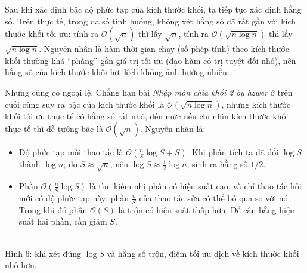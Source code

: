 \documentclass[11pt]{article}
\newcommand{\Oh}{\mathcal{O}}
\begin{document}
Sau khi xác định bậc độ phức tạp của kích thước khối, ta tiếp tục xác định
hằng số. Trên thực tế, trong đa số tình huống, không xét hằng số đã rất gần
với kích thước khối tối ưu: tính ra \(\Oh(\sqrt n)\) thì lấy \(\sqrt n\),
tính ra \(\Oh(\sqrt{n\log n})\) thì lấy \(\sqrt{n\log n}\). Nguyên nhân là
hàm thời gian chạy (số phép tính) theo kích thước khối thường khá ``phẳng''
gần giá trị tối ưu (đạo hàm có trị tuyệt đối nhỏ), nên hằng số của kích thước
khối hơi lệch không ảnh hưởng nhiều.

Nhưng cũng có ngoại lệ. Chẳng hạn bài \emph{Nhập môn chia khối 2 by hzwer} ở
trên cuối cùng suy ra bậc của kích thước khối là \(\Oh(\sqrt{n\log n})\),
nhưng kích thước khối tối ưu thực tế có hằng số rất nhỏ, đến mức nếu chỉ nhìn
kích thước khối thực tế thì dễ tưởng bậc là \(\Oh(\sqrt n)\). Nguyên nhân là:
\begin{itemize}
  \item Độ phức tạp mỗi thao tác là
  \(\Oh\left(\frac nS\log S+S\right)\). Khi phân tích ta đã đổi
  \(\log S\) thành \(\log n\); do \(S\approx \sqrt n\), nên
  \(\log S\approx \frac12\log n\), sinh ra hằng số \(1/2\).
  \item Phần \(\Oh\left(\frac nS\log S\right)\) là tìm kiếm nhị phân có hiệu
  suất cao, và chỉ thao tác hỏi mới có độ phức tạp này; phần \(\frac nS\) của
  thao tác sửa có thể bỏ qua so với nó. Trong khi đó phần \(\Oh(S)\) là trộn
  có hiệu suất thấp hơn. Để cân bằng hiệu suất hai phần, cần giảm \(S\).
\end{itemize}

\begin{center}
\\[-0.2em]
{\small Hình 6: khi xét đúng \(\log S\) và hằng số trộn, điểm tối ưu dịch về kích thước khối nhỏ hơn.}
\end{center}
\end{document}
